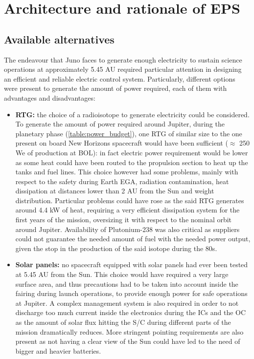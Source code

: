 \section{Architecture and rationale of EPS}
\label{sec:EPS_architecture_rationale}

\subsection{Available alternatives}
\label{subsec:available_alternatives}

The endeavour that Juno faces to generate enough electricity to sustain science operations at approximately 5.45 AU required particular attention in designing an efficient and reliable electric control system. Particularly, different options were present to generate the amount of power required, each of them with advantages and disadvantages:

\begin{itemize}
    \item \textbf{RTG:} the choice of a radioisotope to generate electricity could be considered. To generate the amount of power required around Jupiter, during the planetary phase (\autoref{table:power_budget}), one RTG of similar size to the one present on board New Horizons spacecraft  would have been sufficient ($\approx$ 250 We of production at BOL):\cite{nh_rtg} in fact electric power requirement would be lower as some heat could have been routed to the propulsion section to heat up the tanks and fuel lines. This choice however had some problems, mainly with respect to the safety during Earth EGA, radiation contamination, heat dissipation at distances lower than 2 AU from the Sun and weight distribution. Particular problems could have rose as the said RTG generates around 4.4 kW of heat, requiring a very efficient dissipation system for the first years of the mission, oversizing it with respect to the nominal orbit around Jupiter. Availability of Plutonium-238 was also critical as suppliers could not guarantee the needed amount of fuel with the needed power output, given the stop in the production of the said isotope during the 80s.\cite{plutonium}
    
    \item \textbf{Solar panels:} no spacecraft equipped with solar panels had ever been tested at 5.45 AU from the Sun. This choice would have required a very large surface area, and thus precautions had to be taken into account inside the fairing during launch operations, to provide enough power for safe operations at Jupiter. A complex management system is also required in order to not discharge too much current inside the electronics during the ICs and the OC as the amount of solar flux hitting the S/C during different parts of the mission dramatically reduces. More stringent pointing requirements are also present as not having a clear view of the Sun could have led to the need of bigger and heavier batteries.
\end{itemize}

